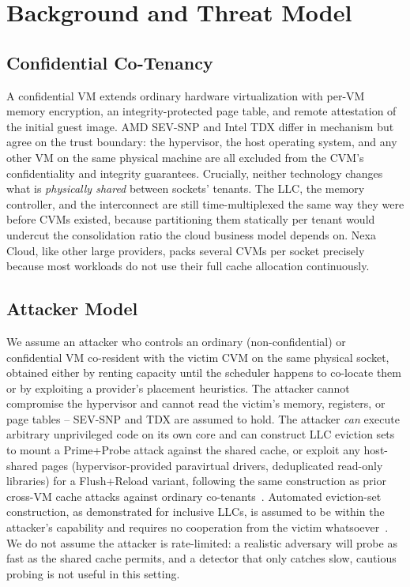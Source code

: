 \section{Background and Threat Model}
\label{sec:background}

\subsection{Confidential Co-Tenancy}

A confidential VM extends ordinary hardware virtualization with per-VM memory encryption, an
integrity-protected page table, and remote attestation of the initial guest image. AMD
SEV-SNP and Intel TDX differ in mechanism but agree on the trust boundary: the hypervisor,
the host operating system, and any other VM on the same physical machine are all excluded
from the CVM's confidentiality and integrity guarantees. Crucially, neither technology
changes what is \emph{physically shared} between sockets' tenants. The LLC, the memory
controller, and the interconnect are still time-multiplexed the same way they were before
CVMs existed, because partitioning them statically per tenant would undercut the
consolidation ratio the cloud business model depends on. Nexa Cloud, like other large
providers, packs several CVMs per socket precisely because most workloads do not use their
full cache allocation continuously.

\subsection{Attacker Model}

We assume an attacker who controls an ordinary (non-confidential) or confidential VM
co-resident with the victim CVM on the same physical socket, obtained either by renting
capacity until the scheduler happens to co-locate them or by exploiting a provider's
placement heuristics. The attacker cannot compromise the hypervisor and cannot read the
victim's memory, registers, or page tables -- SEV-SNP and TDX are assumed to hold. The
attacker \emph{can} execute arbitrary unprivileged code on its own core and can construct LLC
eviction sets to mount a Prime+Probe attack against the shared cache, or exploit any
host-shared pages (hypervisor-provided paravirtual drivers, deduplicated read-only libraries)
for a Flush+Reload variant, following the same construction as prior cross-VM cache attacks
against ordinary co-tenants~\cite{okonkwo2015cache,laurent2014flushreload}. Automated
eviction-set construction, as demonstrated for inclusive LLCs, is assumed to be within the
attacker's capability and requires no cooperation from the victim
whatsoever~\cite{tanaka2017templates}. We do not assume the attacker is rate-limited: a
realistic adversary will probe as fast as the shared cache permits, and a detector that only
catches slow, cautious probing is not useful in this setting.

